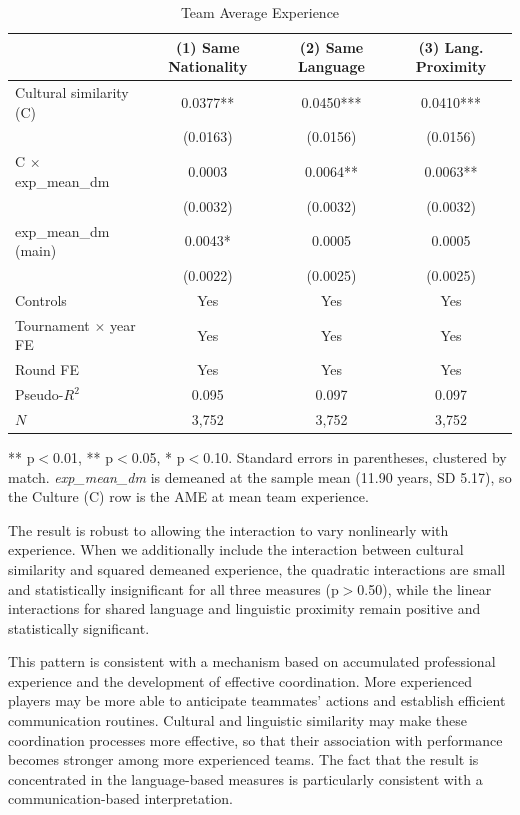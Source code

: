 \documentclass[10pt]{article}
\begin{document}
\begin{table}[htbp]
\color{red}
\centering
\caption{Team Average Experience \label{tab:t6}}
\begin{threeparttable}
\begin{tabular}{lccc}
\toprule
 & (1) Same Nationality & (2) Same Language & (3) Lang. Proximity \\
\midrule
Cultural similarity (C)  & 0.0377** & 0.0450*** & 0.0410*** \\
 & (0.0163) & (0.0156) & (0.0156) \\
C $\times$ exp\_mean\_dm & 0.0003 & 0.0064** & 0.0063** \\
 & (0.0032) & (0.0032) & (0.0032) \\
exp\_mean\_dm (main) & 0.0043* & 0.0005 & 0.0005 \\
 & (0.0022) & (0.0025) & (0.0025) \\
\midrule
Controls & Yes & Yes & Yes \\
Tournament $\times$ year FE & Yes & Yes & Yes \\
Round FE & Yes & Yes & Yes \\
Pseudo-$R^2$ & 0.095 & 0.097 & 0.097 \\
$N$ & 3,752 & 3,752 & 3,752 \\
\bottomrule
\end{tabular}
\begin{tablenotes}
\small
\item *** p$<$0.01, ** p$<$0.05, * p$<$0.10. Standard errors in parentheses, clustered by match. \textit{exp\_mean\_dm} is demeaned at the sample mean (11.90 years, SD 5.17), so the Culture (C) row is the AME at mean team experience.
\end{tablenotes}
\end{threeparttable}
\end{table}
\FloatBarrier



The result is robust to allowing the interaction to vary nonlinearly with experience. When we additionally include the interaction between cultural similarity and squared demeaned experience, the quadratic interactions are small and statistically insignificant for all three measures (p$>$0.50), while the linear interactions for shared language and linguistic proximity remain positive and statistically significant. %

This pattern is consistent with a mechanism based on accumulated professional experience and the development of effective coordination. More experienced players may be more able to anticipate teammates' actions and establish efficient communication routines. Cultural and linguistic similarity may make these coordination processes more effective, so that their association with performance becomes stronger among more experienced teams. The fact that the result is concentrated in the language-based measures is particularly consistent with a communication-based interpretation.
\end{document}
